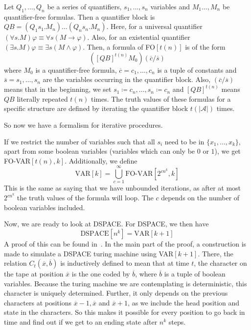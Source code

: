 \begin{define}[{FO$[t(n)]$}]
    Let $Q_1, \dots, Q_n$ be a series of quantifiers, $s_1, \dots, s_n$ variables and $M_1 \dots, M_n$ be quantifier-free formulas.
    Then a quantifier block is $QB = (Q_{1}s_{1}.M_{n})\dots(Q_{n}s_{n}.M_{n})$.
    Here, for a universal quantifier $(\forall s.M)\varphi \equiv \forall s (M \to \varphi)$.
    Also, for an existential quantifier $(\exists s.M)\varphi \equiv \exists s(M \land \varphi)$.
    Then, a formula of FO$[t(n)]$ is of the form
    \[
        \left([QB]^{t(n)}M_{0}\right)(\overline{c} / \overline{s})
    \]
    where $M_0$ is a quantifier-free formula, $\overline{c} = c_1, \dots, c_n$ is a tuple of constants and $\overline{s} = s_1, \dots, s_n$ are the variables occurring in the quantifier block.
    Also, $(\overline{c} / \overline{s})$ means that in the beginning, we set $s_1 \coloneqq c_n, \dots, s_n \coloneqq c_n$ and $[QB]^{t(n)}$ means $QB$ literally repeated $t(n)$ times.
    The truth values of these formulas for a specific structure are defined by iterating the quantifier block $t(|\mathcal{A}|)$ times.
\end{define}
So now we have a formalism for iterative procedures.

If we restrict the number of variables such that all $s_i$ need to be in $\{x_1, \dots, x_k \}$, apart from some boolean variables (variables which can only be $0$ or $1$), we get FO-VAR$[t(n), k]$.
Additionally, we define
\[
    \text{VAR}[k] = \bigcup_{c = 1}^{\infty}\text{FO-VAR}[2^{cn^k}, k]
\]
This is the same as saying that we have unbounded iterations, as after at most $2^{cn^k}$ the truth values of the formula will loop.
The $c$ depends on the number of boolean variables included.

Now, we are ready to look at DSPACE\@.
For DSPACE, we then have
\[
    \text{DSPACE}[n^k] = \text{VAR}[k + 1]
\]
A proof of this can be found in~\cite{descriptive-complexity}.
In the main part of the proof, a construction is made to simulate a DSPACE turing machine using VAR$[k + 1]$.
There, the relation $C_{t}(\overline{x}, \overline{b})$ is inductively defined to mean that at time $t$, the character on the tape at position $\overline{x}$ is the one coded by $\overline{b}$, where $\overline{b}$ is a tuple of boolean variables.
Because the turing machine we are contemplating is deterministic, this character is uniquely determined.
Further, it only depends on the previous characters at positions $\overline{x} - 1, \overline{x}$ and $\overline{x} + 1$, as we include the head position and state in the characters.
So this makes it possible for every position to go back in time and find out if we get to an ending state after $n^k$ steps.

